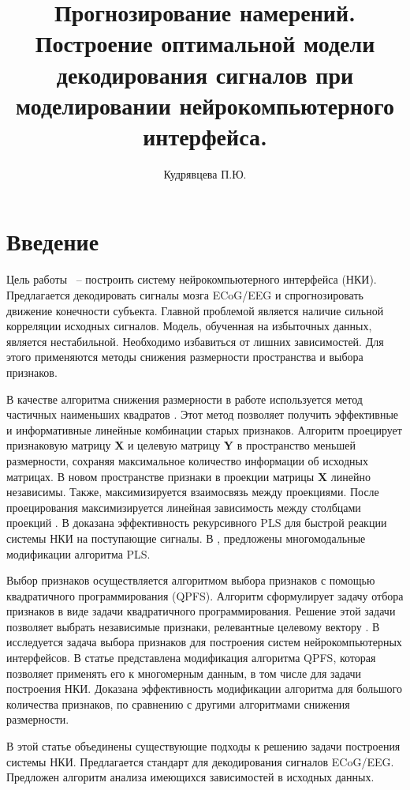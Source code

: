 \documentclass[12pt,twoside]{article}
\title
    [Построение оптимальной системы нейрокомпьютерного интерфейса]
    {Прогнозирование намерений. Построение оптимальной модели декодирования сигналов при моделировании нейрокомпьютерного интерфейса.}
\author {Кудрявцева П.Ю.} %
\begin{document}
\maketitle



\section{Введение}
 Цель работы ~-- построить систему нейрокомпьютерного интерфейса (НКИ). Предлагается декодировать сигналы мозга ECoG/EEG и спрогнозировать движение конечности субъекта. Главной проблемой  является наличие сильной корреляции исходных сигналов. Модель, обученная на избыточных данных, является нестабильной. Необходимо избавиться от лишних зависимостей. Для этого применяются методы снижения размерности пространства и выбора признаков.
 
 В качестве алгоритма снижения размерности в работе используется метод частичных наименьших квадратов \cite{pls_effective}. Этот метод позволяет получить эффективные и информативные линейные комбинации старых признаков. Алгоритм проецирует признаковую матрицу  \textbf{X}  и целевую матрицу  \textbf{Y}  в пространство меньшей размерности, сохраняя максимальное количество информации об исходных матрицах. В новом пространстве признаки в проекции матрицы \textbf{X} линейно независимы. Также, максимизируется взаимосвязь между проекциями. После проецирования максимизируется линейная зависимость между столбцами проекций \cite{pls_ni}. В \cite{elisey} доказана эффективность рекурсивного PLS для быстрой реакции системы НКИ на поступающие сигналы. В \cite{elisey2}, \cite{elisey3}  предложены многомодальные модификации алгоритма PLS. 
 
 Выбор признаков осуществляется алгоритмом выбора признаков с помощью квадратичного программирования (QPFS). Алгоритм сформулирует задачу отбора признаков в виде задачи квадратичного программирования. Решение этой задачи позволяет выбрать независимые признаки, релевантные целевому вектору \cite{qpfc}. В \cite{motrenko} исследуется задача выбора признаков для построения систем нейрокомпьютерных интерфейсов. В статье представлена модификация алгоритма QPFS, которая позволяет применять его к многомерным данным, в том числе для задачи построения НКИ. Доказана эффективность модификации алгоритма для большого количества признаков, по сравнению с другими алгоритмами снижения размерности.
 
 В этой статье объединены существующие подходы к решению задачи построения системы НКИ. Предлагается стандарт для декодирования сигналов ECoG/EEG. Предложен алгоритм анализа имеющихся зависимостей в исходных данных. 
\end{document}
